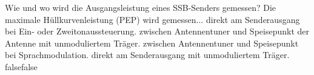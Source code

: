     {Wie und wo wird die Ausgangsleistung eines SSB-Senders gemessen? Die maximale Hüllkurvenleistung (PEP) wird gemessen...}
    {direkt am Senderausgang bei Ein- oder Zweitonaussteuerung.}
    {zwischen Antennentuner und Speisepunkt der Antenne mit unmoduliertem Träger.}
    {zwischen Antennentuner und Speisepunkt bei Sprachmodulation.}
    {direkt am Senderausgang mit unmoduliertem Träger.}
    {false}{false}